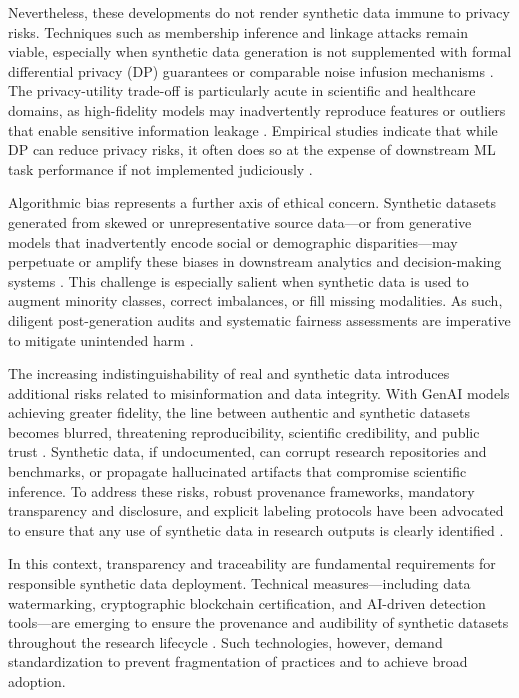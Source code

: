 \documentclass[sigconf]{acmart}
\begin{document}
Nevertheless, these developments do not render synthetic data immune to privacy risks. Techniques such as membership inference and linkage attacks remain viable, especially when synthetic data generation is not supplemented with formal differential privacy (DP) guarantees or comparable noise infusion mechanisms \cite{ref12}\cite{ref14}\cite{ref16}. The privacy-utility trade-off is particularly acute in scientific and healthcare domains, as high-fidelity models may inadvertently reproduce features or outliers that enable sensitive information leakage \cite{ref8}\cite{ref12}\cite{ref18}. Empirical studies indicate that while DP can reduce privacy risks, it often does so at the expense of downstream ML task performance if not implemented judiciously \cite{ref12}\cite{ref16}.

Algorithmic bias represents a further axis of ethical concern. Synthetic datasets generated from skewed or unrepresentative source data—or from generative models that inadvertently encode social or demographic disparities—may perpetuate or amplify these biases in downstream analytics and decision-making systems \cite{ref7}\cite{ref8}\cite{ref14}\cite{ref21}\cite{ref82}. This challenge is especially salient when synthetic data is used to augment minority classes, correct imbalances, or fill missing modalities. As such, diligent post-generation audits and systematic fairness assessments are imperative to mitigate unintended harm \cite{ref6}\cite{ref7}\cite{ref82}.

The increasing indistinguishability of real and synthetic data introduces additional risks related to misinformation and data integrity. With GenAI models achieving greater fidelity, the line between authentic and synthetic datasets becomes blurred, threatening reproducibility, scientific credibility, and public trust \cite{ref5}\cite{ref9}\cite{ref21}\cite{ref60}. Synthetic data, if undocumented, can corrupt research repositories and benchmarks, or propagate hallucinated artifacts that compromise scientific inference. To address these risks, robust provenance frameworks, mandatory transparency and disclosure, and explicit labeling protocols have been advocated to ensure that any use of synthetic data in research outputs is clearly identified \cite{ref5}\cite{ref21}.

In this context, transparency and traceability are fundamental requirements for responsible synthetic data deployment. Technical measures—including data watermarking, cryptographic blockchain certification, and AI-driven detection tools—are emerging to ensure the provenance and audibility of synthetic datasets throughout the research lifecycle \cite{ref5}\cite{ref21}\cite{ref60}. Such technologies, however, demand standardization to prevent fragmentation of practices and to achieve broad adoption.
\end{document}
